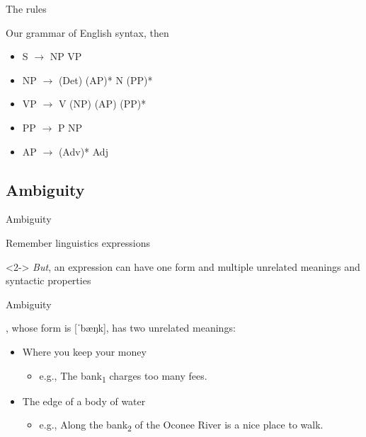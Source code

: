 \documentclass{beamer}
\newcommand{\subonethree}{The rules}
\newcommand{\subonefour}{Ambiguity}
\begin{document}
      \begin{frame}{\subonethree}
        \begin{block}{}
          Our grammar of English syntax, then
        \end{block}
        \begin{block}{}
          \begin{itemize}
            \item S $\rightarrow$ NP VP
            \item NP $\rightarrow$ (Det) (AP)* N (PP)*
            \item VP $\rightarrow$ V (NP) (AP) (PP)*
            \item PP $\rightarrow$ P NP
            \item AP $\rightarrow$ (Adv)* Adj
          \end{itemize}
        \end{block}
      \end{frame}

    \subsection{\subonefour}
      \begin{frame}{\subonefour}
        \begin{block}{Remember linguistics expressions}
          
        \end{block}
        \begin{alertblock}<2->{}
          \emph{But}, an expression can have one form and multiple unrelated meanings and syntactic properties
        \end{alertblock}
      \end{frame}

      \begin{frame}{\subonefour}
        \begin{example}
          , whose form is [ˈbæŋk], has two unrelated meanings:
          \begin{itemize}
            \item<2-> Where you keep your money
            \begin{itemize}
              \item<2-> e.g., The bank\textsubscript{1} charges too many fees.
            \end{itemize}
            \item<2->  The edge of a body of water
            \begin{itemize}
              \item<2-> e.g., Along the bank\textsubscript{2} of the Oconee River is a nice place to walk.
            \end{itemize}
          \end{itemize}
        \end{example}
      \end{frame}
\end{document}
